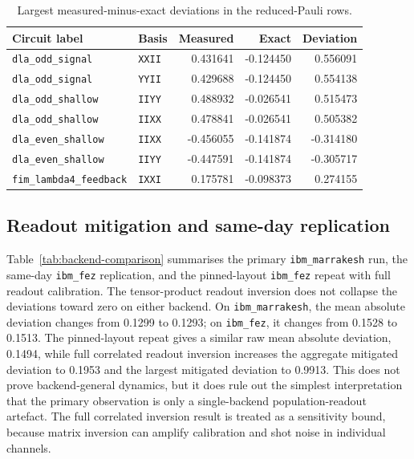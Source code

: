 \documentclass[preprint,aps,physrev,superscriptaddress,floatfix,longbibliography]{revtex4-2}
\begin{document}
\begin{table}[tb]
\centering
\small
\begin{tabular}{llrrr}
\toprule
Circuit label & Basis & Measured & Exact & Deviation \\
\midrule
\texttt{dla\_odd\_signal} & \texttt{XXII} & 0.431641 & -0.124450 & 0.556091 \\
\texttt{dla\_odd\_signal} & \texttt{YYII} & 0.429688 & -0.124450 & 0.554138 \\
\texttt{dla\_odd\_shallow} & \texttt{IIYY} & 0.488932 & -0.026541 & 0.515473 \\
\texttt{dla\_odd\_shallow} & \texttt{IIXX} & 0.478841 & -0.026541 & 0.505382 \\
\texttt{dla\_even\_shallow} & \texttt{IIXX} & -0.456055 & -0.141874 & -0.314180 \\
\texttt{dla\_even\_shallow} & \texttt{IIYY} & -0.447591 & -0.141874 & -0.305717 \\
\texttt{fim\_lambda4\_feedback} & \texttt{IXXI} & 0.175781 & -0.098373 & 0.274155 \\
\bottomrule
\end{tabular}
\caption{Largest measured-minus-exact deviations in the reduced-Pauli rows.}
\label{tab:top}
\end{table}

\subsection{Readout mitigation and same-day replication}

Table~\ref{tab:backend-comparison} summarises the primary
\texttt{ibm\_marrakesh} run, the same-day \texttt{ibm\_fez} replication, and
the pinned-layout \texttt{ibm\_fez} repeat with full readout calibration.
The tensor-product readout inversion does not collapse the deviations toward
zero on either backend. On \texttt{ibm\_marrakesh}, the mean absolute deviation
changes from 0.1299 to 0.1293; on \texttt{ibm\_fez}, it changes from 0.1528 to
0.1513. The pinned-layout repeat gives a similar raw mean absolute deviation,
0.1494, while full correlated readout inversion increases the aggregate
mitigated deviation to 0.1953 and the largest mitigated deviation to 0.9913.
This does not prove backend-general dynamics, but it does rule out the simplest
interpretation that the primary observation is only a single-backend
population-readout artefact. The full correlated inversion result is treated as
a sensitivity bound, because matrix inversion can amplify calibration and shot
noise in individual channels.
\end{document}
